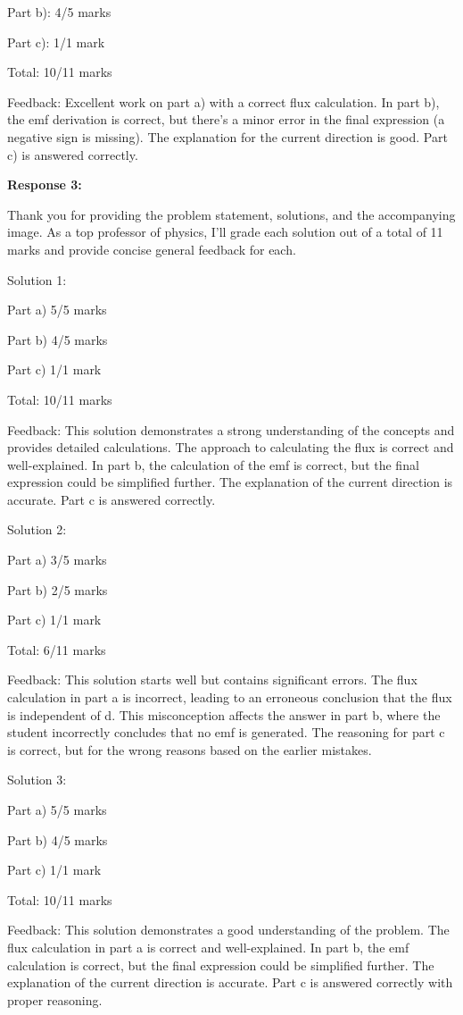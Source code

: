 \documentclass[a4paper,11pt]{article}
\begin{document}
Part b): 4/5 marks

Part c): 1/1 mark

Total: 10/11 marks

Feedback: Excellent work on part a) with a correct flux calculation. In part b), the emf derivation is correct, but there's a minor error in the final expression (a negative sign is missing). The explanation for the current direction is good. Part c) is answered correctly.

\bigskip
\textbf{Response 3:}

Thank you for providing the problem statement, solutions, and the accompanying image. As a top professor of physics, I'll grade each solution out of a total of 11 marks and provide concise general feedback for each.

Solution 1:

Part a) 5/5 marks

Part b) 4/5 marks

Part c) 1/1 mark

Total: 10/11 marks

Feedback: This solution demonstrates a strong understanding of the concepts and provides detailed calculations. The approach to calculating the flux is correct and well-explained. In part b, the calculation of the emf is correct, but the final expression could be simplified further. The explanation of the current direction is accurate. Part c is answered correctly.

Solution 2:

Part a) 3/5 marks

Part b) 2/5 marks

Part c) 1/1 mark

Total: 6/11 marks

Feedback: This solution starts well but contains significant errors. The flux calculation in part a is incorrect, leading to an erroneous conclusion that the flux is independent of d. This misconception affects the answer in part b, where the student incorrectly concludes that no emf is generated. The reasoning for part c is correct, but for the wrong reasons based on the earlier mistakes.

Solution 3:

Part a) 5/5 marks

Part b) 4/5 marks

Part c) 1/1 mark

Total: 10/11 marks

Feedback: This solution demonstrates a good understanding of the problem. The flux calculation in part a is correct and well-explained. In part b, the emf calculation is correct, but the final expression could be simplified further. The explanation of the current direction is accurate. Part c is answered correctly with proper reasoning.
\end{document}
